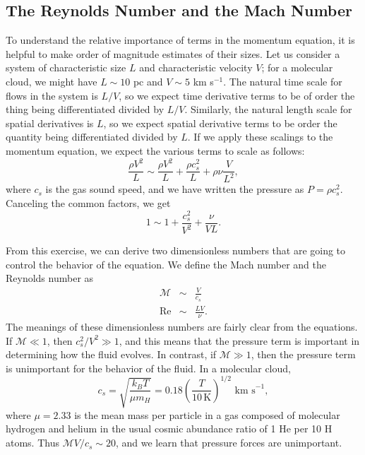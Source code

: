 \subsection{The Reynolds Number and the Mach Number}
\label{ssec:reynolds_mach}

To understand the relative importance of terms in the momentum equation, it is helpful to make order of magnitude estimates of their sizes. Let us consider a system of characteristic size $L$ and characteristic velocity $V$; for a molecular cloud, we might have $L\sim 10$ pc and $V\sim 5$ km s$^{-1}$. The natural time scale for flows in the system is $L/V$, so we expect time derivative terms to be of order the thing being differentiated divided by $L/V$. Similarly, the natural length scale for spatial derivatives is $L$, so we expect spatial derivative terms to be order the quantity being differentiated divided by $L$. If we apply these scalings to the momentum equation, we expect the various terms to scale as follows:
\begin{equation}
\frac{\rho V^2}{L} \sim \frac{\rho V^2}{L} + \frac{\rho c_s^2}{L} + \rho \nu \frac{V}{L^2},
\end{equation}
where $c_s$ is the gas sound speed, and we have written the pressure as $P = \rho c_s^2$. Canceling the common factors, we get
\begin{equation}
1 \sim 1 + \frac{c_s^2}{V^2} + \frac{\nu}{VL}.
\end{equation}

From this exercise, we can derive two dimensionless numbers that are going to control the behavior of the equation. We define the Mach number and the Reynolds number as
\begin{eqnarray}
\mathcal{M} & \sim & \frac{V}{c_s} \\
\mathrm{Re} & \sim & \frac{LV}{\nu}.
\end{eqnarray}
The meanings of these dimensionless numbers are fairly clear from the equations. If $\mathcal{M} \ll 1$, then $c_s^2/V^2 \gg 1$, and this means that the pressure term is important in determining how the fluid evolves. In contrast, if $\mathcal{M} \gg 1$, then the pressure term is unimportant for the behavior of the fluid. In a molecular cloud,
\begin{equation}
c_s  =\sqrt{\frac{k_B T}{\mu m_H}} = 0.18 \left(\frac{T}{10\,\mathrm{K}}\right)^{1/2}\mbox{ km s}^{-1},
\end{equation}
where $\mu =2.33$ is the mean mass per particle in a gas composed of molecular hydrogen and helium in the usual cosmic abundance ratio of 1 He per 10 H atoms. Thus $\mathcal{M} V/c_s \sim 20$, and we learn that pressure forces are unimportant.

